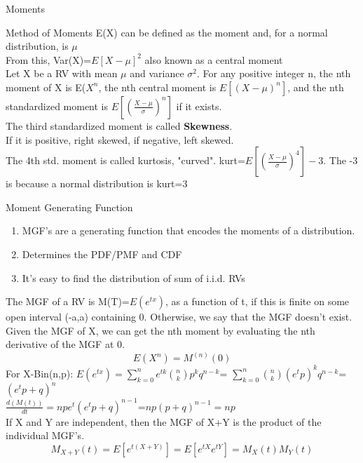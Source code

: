\documentclass[a4paper, 12pt]{article}
\begin{document}
\begin{section}{Moments}
\begin{subsection}{Method of Moments}
E(X) can be defined as the moment and, for a normal distribution, is $\mu$\\
From this, Var(X)=$E[X-\mu]^{2}$ also known as a central moment\\
Let X be a RV with mean $\mu$ and variance $\sigma ^{2}$. For any positive integer n, the nth moment of X is E($X^{n}$, the nth central moment is $E[(X-\mu)^{n}]$, and the nth standardized moment is $E[(\frac{X-\mu}{\sigma})^{n}]$ if it exists.\\
The third standardized moment is called \textbf{Skewness}.\\
If it is positive, right skewed, if negative, left skewed.\\
The 4th std. moment is called kurtosis, "curved". kurt=$E[(\frac{X-\mu}{\sigma})^{4}]-3$. The -3 is because a normal distribution is kurt=3\\
\end{subsection}
\begin{subsection}{Moment Generating Function}
\begin{enumerate}
\item{MGF's are a generating function that encodes the moments of a distribution.}
\item{Determines the PDF/PMF and CDF}
\item{It's easy to find the distribution of sum of i.i.d. RVs}
\end{enumerate}
The MGF of a RV is M(T)=$E(e^{tx})$, as a function of t, if this is finite on some open interval (-a,a) containing 0. Otherwise, we say that the MGF doesn't exist.\\
Given the MGF of X, we can get the nth moment by evaluating the nth derivative of the MGF at 0.
\begin{equation} 
E(X^{n})=M^{(n)}(0)
\end{equation}
For X-Bin(n,p): $E(e^{tx})=\sum_{k=0}^{n}e^{tk}{n \choose k}p^{k}q^{n-k}$=
$\sum_{k=0}^{n}{n \choose k}(e^{t}p)^{k}q^{n-k}$=$(e^{t}p+q)^{n}$\\
$\frac{d(M(t))}{dt}=npe^{t}(e^{t}p+q)^{n-1}$=$np(p+q)^{n-1}=np$\\
If X and Y are independent, then the MGF of X+Y is the product of the individual MGF's. 
\begin{equation} 
	M_{X+Y}(t)=E[e^{t(X+Y)}]=E[e^{tX}e^{tY}]=M_{X}(t)M_{Y}(t)
\end{equation}
\end{subsection}
\end{section}
\end{document}
